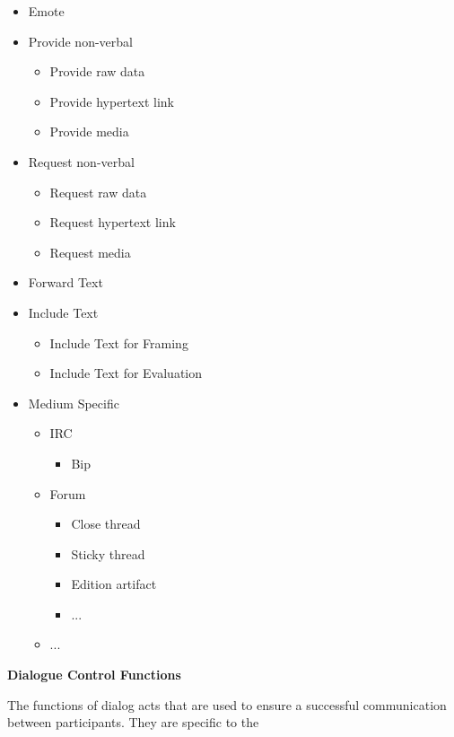\begin{itemize}
	\item Emote
	\item Provide non-verbal
		\begin{itemize}
			\item Provide raw data
			\item Provide hypertext link
			\item Provide media
		\end{itemize}
	\item Request non-verbal
		\begin{itemize}
			\item Request raw data
			\item Request hypertext link
			\item Request media
		\end{itemize}
	\item Forward Text
	\item Include Text
		\begin{itemize}
			\item Include Text for Framing
			\item Include Text for Evaluation
		\end{itemize}
	\item Medium Specific
		\begin{itemize}
			\item IRC
				\begin{itemize}
					\item Bip
				\end{itemize}
			\item Forum
				\begin{itemize}
					\item Close thread
					\item Sticky thread
					\item Edition artifact
					\item ...
				\end{itemize}
			\item ...
		\end{itemize}
\end{itemize}

\textbf{Dialogue Control Functions}
\vspace{0.1cm}

The functions of dialog acts that are used to ensure a successful communication between participants. They are specific to the 

